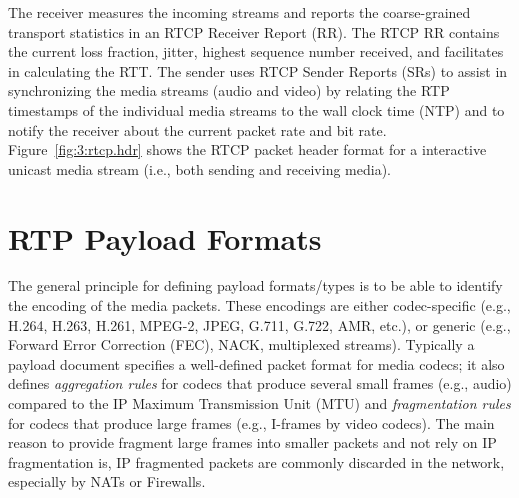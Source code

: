 
The receiver measures the incoming streams and reports the coarse-grained
transport statistics in an RTCP Receiver Report (RR). The RTCP RR contains the
current loss fraction, jitter, highest sequence number received, and
facilitates in calculating the RTT. The sender uses RTCP Sender Reports (SRs)
to assist in synchronizing the media streams (audio and video) by relating the
RTP timestamps of the individual media streams to the wall clock time (NTP)
and to notify the receiver about the current packet rate and bit rate.
Figure~\ref{fig:3:rtcp.hdr} shows the RTCP packet header format for a
interactive unicast media stream (i.e., both sending and receiving media).

\section{RTP Payload Formats}

The general principle for defining payload formats/types is to be able to
identify the encoding of the media packets. These encodings are either  
codec-specific (e.g., H.264, H.263, H.261, MPEG-2, JPEG, G.711, G.722, AMR, etc.),
or generic (e.g., Forward Error Correction (FEC), NACK, multiplexed streams).
Typically a payload document specifies a well-defined packet format for media
codecs; it also defines \emph{aggregation rules} for codecs that produce
several small frames (e.g., audio) compared to the IP Maximum Transmission
Unit (MTU) and \emph{fragmentation rules} for codecs that produce large frames
(e.g., I-frames by video codecs). The main reason to provide fragment large
frames  into smaller packets and not rely on IP fragmentation is, IP
fragmented packets are commonly discarded in the network, especially by NATs
or Firewalls.


